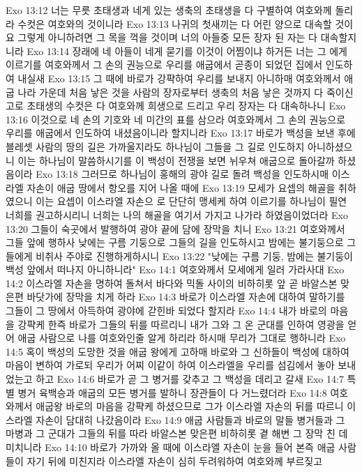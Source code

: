 Exo 13:12  너는 무릇 초태생과 네게 있는 생축의 초태생을 다 구별하여 여호와께 돌리라 수컷은 여호와의 것이니라
Exo 13:13  나귀의 첫새끼는 다 어린 양으로 대속할 것이요 그렇게 아니하려면 그 목을 꺽을 것이며 너의 아들중 모든 장자 된 자는 다 대속할지니라
Exo 13:14  장래에 네 아들이 네게 묻기를 이것이 어찜이냐 하거든 너는 그 에게 이르기를 여호와께서 그 손의 권능으로 우리를 애굽에서 곧종이 되었던 집에서 인도하여 내실새
Exo 13:15  그 때에 바로가 강퍅하여 우리를 보내지 아니하매 여호와께서 애굽 나라 가운데 처음 낳은 것을 사람의 장자로부터 생축의 처음 낳은 것까지 다 죽이신 고로 초태생의 수컷은 다 여호와께 희생으로 드리고 우리 장자는 다 대속하나니
Exo 13:16  이것으로 네 손의 기호와 네 미간의 표를 삼으라 여호와께서 그 손의 권능으로 우리를 애굽에서 인도하여 내셨음이니라 할지니라
Exo 13:17  바로가 백성을 보낸 후에 블레셋 사람의 땅의 길은 가까울지라도 하나님이 그들을 그 길로 인도하지 아니하셨으니 이는 하나님이 말씀하시기를 이 백성이 전쟁을 보면 뉘우쳐 애굽으로 돌아갈까 하셨음이라
Exo 13:18  그러므로 하나님이 홍해의 광야 길로 돌려 백성을 인도하시매 이스라엘 자손이 애굽 땅에서 항오를 지어 나올 때에
Exo 13:19  모세가 요셉의 해골을 취하였으니 이는 요셉이 이스라엘 자손으 로 단단히 맹세케 하여 이르기를 하나님이 필연 너희를 권고하시리니 너희는 나의 해골을 여기서 가지고 나가라 하였음이었더라
Exo 13:20  그들이 숙곳에서 발행하여 광야 끝에 담에 장막을 치니
Exo 13:21  여호와께서 그들 앞에 행하사 낮에는 구름 기둥으로 그들의 길을 인도하시고 밤에는 불기둥으로 그들에게 비취사 주야로 진행하게하시니
Exo 13:22  "낮에는 구름 기둥, 밤에는 불기둥이 백성 앞에서 떠나지 아니하니라"
Exo 14:1  여호와께서 모세에게 일러 가라사대
Exo 14:2  이스라엘 자손을 명하여 돌쳐서 바다와 믹돌 사이의 비하히롯 앞 곧 바알스본 맞은편 바닷가에 장막을 치게 하라
Exo 14:3  바로가 이스라엘 자손에 대하여 말하기를 그들이 그 땅에서 아득하여 광야에 갇힌바 되었다 할지라
Exo 14:4  내가 바로의 마음을 강퍅케 한즉 바로가 그들의 뒤를 따르리니 내가 그와 그 온 군대를 인하여 영광을 얻어 애굽 사람으로 나를 여호와인줄 알게 하리라 하시매 무리가 그대로 행하니라
Exo 14:5  혹이 백성의 도망한 것을 애굽 왕에게 고하매 바로와 그 신하들이 백성에 대하여 마음이 변하여 가로되 우리가 어찌 이같이 하여 이스라엘을 우리를 섬김에서 놓아 보내었는고 하고
Exo 14:6  바로가 곧 그 병거를 갖추고 그 백성을 데리고 갈새
Exo 14:7  특별 병거 육백승과 애굽의 모든 병거를 발하니 장관들이 다 거느렸더라
Exo 14:8  여호와께서 애굽왕 바로의 마음을 강퍅케 하셨으므로 그가 이스라엘 자손의 뒤를 따르니 이스라엘 자손이 담대히 나갔음이라
Exo 14:9  애굽 사람들과 바로의 말들 병거들과 그 마병과 그 군대가 그들의 뒤를 따라 바알스본 맞은편 비하히롯 곁 해변 그 장막 친 데 미치니라
Exo 14:10  바로가 가까와 올 때에 이스라엘 자손이 눈을 들어 본즉 애굽 사람들이 자기 뒤에 미친지라 이스라엘 자손이 심히 두려워하여 여호와께 부르짖고
